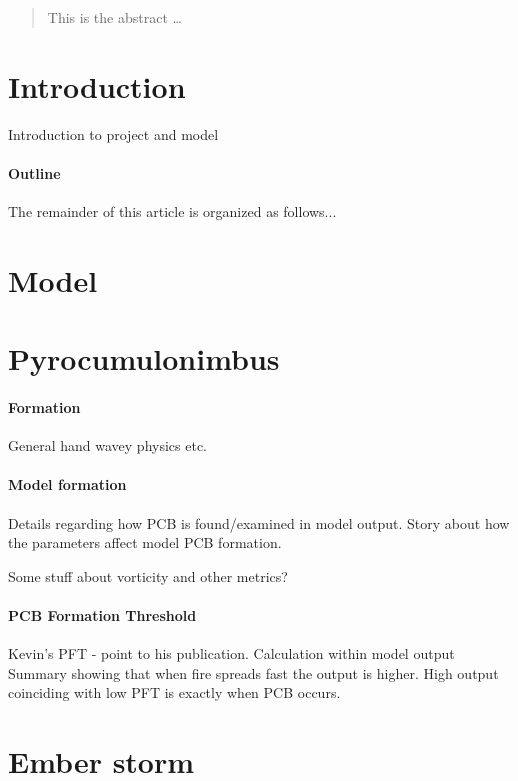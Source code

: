 \documentclass[12pt]{article}
\begin{document}
\maketitle
\tableofcontents


\begin{abstract}
This is the abstract \ldots
\end{abstract}

\section{Introduction} 
  \label{intro}

  Introduction to project and model

  \paragraph{Outline}
    The remainder of this article is organized as follows...
  
\section{Model} 
  \label{model}

\section{Pyrocumulonimbus}
  \label{pcb}
  
  \paragraph{Formation}
    General hand wavey physics etc.
     
  \paragraph{Model formation}
    Details regarding how PCB is found/examined in model output.
    Story about how the parameters affect model PCB formation.
  
    Some stuff about vorticity and other metrics?
    
  \paragraph{PCB Formation Threshold}
    Kevin's PFT - point to his publication.
    Calculation within model output
    Summary showing that when fire spreads fast the output is higher.
    High output coinciding with low PFT is exactly when PCB occurs.
  
  

\section{Ember storm}
  \label{emberstorm}




\end{document}
